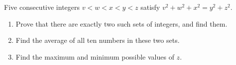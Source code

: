 Five consecutive integers $v<w<x<y<z$ satisfy $v^2+w^2+x^2=y^2+z^2$.
\begin{enumerate}
\item[(a)] Prove that there are exactly two such sets of integers, and find them.
\item[(b)] Find the average of all ten numbers in these two sets.
\item[(c)] Find the maximum and minimum possible values of $z$.
\end{enumerate}
